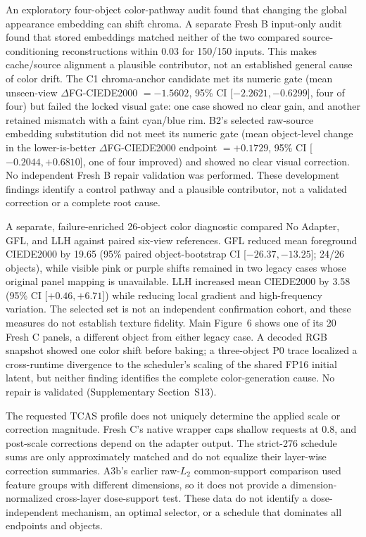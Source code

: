 \documentclass[11pt]{article}
\begin{document}
An exploratory four-object color-pathway audit found that changing the global appearance embedding can shift chroma. A separate Fresh B input-only audit found that stored embeddings matched neither of the two compared source-conditioning reconstructions within 0.03 for 150/150 inputs. This makes cache/source alignment a plausible contributor, not an established general cause of color drift. The C1 chroma-anchor candidate met its numeric gate (mean unseen-view $\Delta$FG-CIEDE2000 $=-1.5602$, 95\% CI [$-2.2621,-0.6299$], four of four) but failed the locked visual gate: one case showed no clear gain, and another retained mismatch with a faint cyan/blue rim. B2's selected raw-source embedding substitution did not meet its numeric gate (mean object-level change in the lower-is-better $\Delta$FG-CIEDE2000 endpoint $=+0.1729$, 95\% CI [$-0.2044,+0.6810$], one of four improved) and showed no clear visual correction. No independent Fresh B repair validation was performed. These development findings identify a control pathway and a plausible contributor, not a validated correction or a complete root cause.

A separate, failure-enriched 26-object color diagnostic compared No Adapter, GFL, and LLH against paired six-view references. GFL reduced mean foreground CIEDE2000 by 19.65 (95\% paired object-bootstrap CI [$-26.37,-13.25$]; 24/26 objects), while visible pink or purple shifts remained in two legacy cases whose original panel mapping is unavailable. LLH increased mean CIEDE2000 by 3.58 (95\% CI [$+0.46,+6.71$]) while reducing local gradient and high-frequency variation. The selected set is not an independent confirmation cohort, and these measures do not establish texture fidelity. Main Figure~6 shows one of its 20 Fresh C panels, a different object from either legacy case. A decoded RGB snapshot showed one color shift before baking; a three-object P0 trace localized a cross-runtime divergence to the scheduler's scaling of the shared FP16 initial latent, but neither finding identifies the complete color-generation cause. No repair is validated (Supplementary Section~S13).

The requested TCAS profile does not uniquely determine the applied scale or correction magnitude. Fresh C's native wrapper caps shallow requests at 0.8, and post-scale corrections depend on the adapter output. The strict-276 schedule sums are only approximately matched and do not equalize their layer-wise correction summaries. A3b's earlier raw-$L_2$ common-support comparison used feature groups with different dimensions, so it does not provide a dimension-normalized cross-layer dose-support test. These data do not identify a dose-independent mechanism, an optimal selector, or a schedule that dominates all endpoints and objects.
\end{document}

